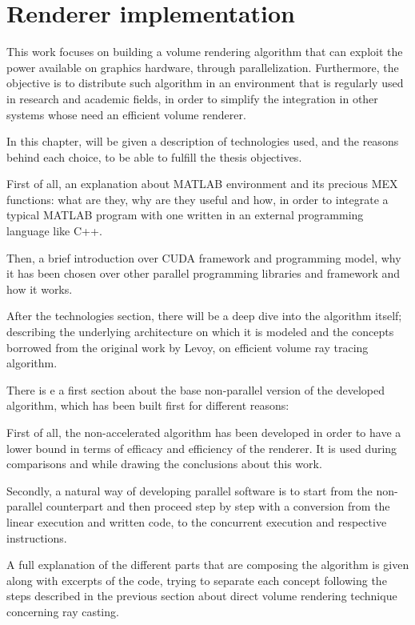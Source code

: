 \documentclass[12pt,a4paper]{extarticle}
\newcommand{\linespace}{\vspace{0pt}}
\begin{document}
\section{Renderer implementation} 
This work focuses on building a volume rendering algorithm that can exploit the power available on graphics hardware, through parallelization. Furthermore, the objective is to distribute such algorithm in an environment that is regularly used in research and academic fields, in order to simplify the integration in other systems whose need an efficient volume renderer.

In this chapter, will be given a description of technologies used, and the reasons behind each choice, to be able to fulfill the thesis objectives.
\linespace

First of all, an explanation about MATLAB environment and its precious MEX functions: what are they, why are they useful and how, in order to integrate a typical MATLAB program with one written in an external programming language like C++.

Then, a brief introduction over CUDA framework and programming model, why it has been chosen over other parallel programming libraries and framework and how it works.

After the technologies section, there will be a deep dive into the algorithm itself; describing the underlying architecture on which it is modeled and the concepts borrowed from the original work by Levoy, on efficient volume ray tracing algorithm.
\linespace

There is e a first section about the base non-parallel version of the developed algorithm, which has been built first for different reasons:

First of all, the non-accelerated algorithm has been developed in order to have a lower bound in terms of efficacy and efficiency of the renderer.  It is used during comparisons and while drawing the conclusions about this work.

Secondly, a natural way of developing parallel software is to start from the non-parallel counterpart and then proceed step by step with a conversion from the linear execution and written code, to the concurrent execution and respective instructions.

A full explanation of the different parts that are composing the algorithm is given along with excerpts of the code, trying to separate each concept following the steps described in the previous section about direct volume rendering technique concerning ray casting.
\end{document}
